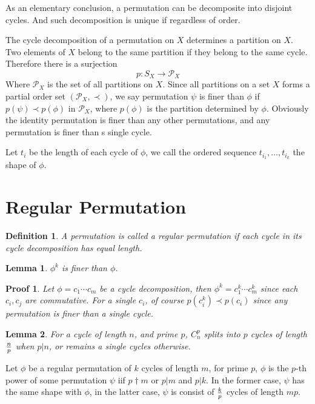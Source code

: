\documentclass{article}
\newtheorem{defi}{Definition}
\newtheorem{lem}{Lemma}
\newtheorem{prof}{Proof}
\begin{document}
As an elementary conclusion, a permutation can be decomposite into disjoint cycles.
And such decomposition is unique if regardless of order.

The cycle decomposition of a permutation on $X$ determines a partition on $X$.
Two elements of $X$ belong to the same partition if they belong to the same cycle.
Therefore there is a surjection
$$p : S_X \to \mathcal P_X$$
Where $\mathcal P_X$ is the set of all partitions on $X$.
Since all partitions on a set $X$ forms a partial order set $(\mathcal P_X, \prec)$,
we say permutation $\psi$ is finer than $\phi$ if $p(\psi) \prec p(\phi)$ in $\mathcal P_X$,
where $p(\phi)$ is the partition determined by $\phi$.
Obviously the identity permutation is finer than any other permutations,
and any permutation is finer than s single cycle.

Let $t_i$ be the length of each cycle of $\phi$,
we call the ordered sequence $t_{i_1}, \dots, t_{i_k}$ the shape of $\phi$.

\section{Regular Permutation}
\begin{defi}
A permutation is called a regular permutation if each cycle
in its cycle decomposition has equal length.
\end{defi}

\begin{lem}
$\phi^k$ is finer than $\phi$.
\end{lem}

\begin{prof}
Let $\phi = c_1 \cdots c_m$ be a cycle decomposition,
then $\phi^k = c_1^k \cdots c_m^k$ since each $c_i, c_j$ are commutative.
For a single $c_i$, of course $p(c_i^k) \prec p(c_i)$ since any permutation is
finer than a single cycle.
\end{prof}

\begin{lem}
For a cycle of length $n$, and prime $p$,
$C_n^p$ splits into $p$ cycles of length $n \over p$ when $p \vert n$,
or remains a single cycles otherwise.
\end{lem}

Let $\phi$ be a regular permutation of $k$ cycles of length $m$,
for prime $p$, $\phi$ is the $p$-th power of some permutation $\psi$
iif $p \dagger m$ or $p \vert m$ and $p \vert k$.
In the former case, $\psi$ has the same shape with $\phi$,
in the latter case, $\psi$ is consist of $k \over p$ cycles of length $mp$.
\end{document}
